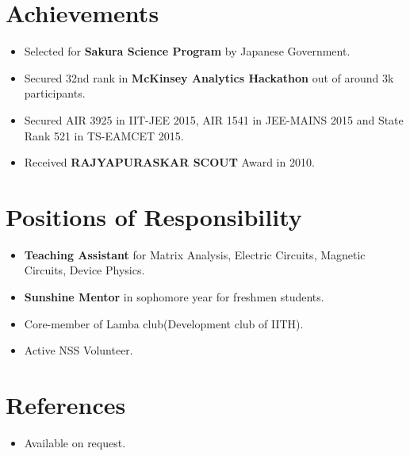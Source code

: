 \documentclass[letterpaper,11pt]{article}
\newcommand{\resumeSubHeadingListStart}{\begin{itemize}[leftmargin=*]}
\newcommand{\resumeSubHeadingListEnd}{\end{itemize}}
\begin{document}
      
      
  
\section{Achievements}
  \resumeSubHeadingListStart
  	\itemsep-0.15em
  	\item{Selected for \textbf{Sakura Science Program} by Japanese Government.}
    \item{Secured 32nd rank in \textbf{McKinsey Analytics Hackathon} out of around 3k participants.}
    \item{Secured AIR 3925 in IIT-JEE 2015, AIR 1541 in JEE-MAINS 2015 and State Rank 521 in TS-EAMCET 2015.}    
    \item{Received \textbf{RAJYAPURASKAR SCOUT} Award in 2010.} 
    
  \resumeSubHeadingListEnd
  
\section{Positions of Responsibility}
  \resumeSubHeadingListStart
  	\itemsep-0.15em
      \item{\textbf{Teaching Assistant} for Matrix Analysis, Electric Circuits, Magnetic Circuits, Device Physics.}
    \item{\textbf{Sunshine Mentor} in sophomore year for freshmen students.}
    \item{Core-member of Lamba club(Development club of IITH).}    
    \item{Active NSS Volunteer.}
  \resumeSubHeadingListEnd

\section{References}
  \resumeSubHeadingListStart
  	\itemsep-0.15em
      \item{Available on request.}

    
  \resumeSubHeadingListEnd
\end{document}
